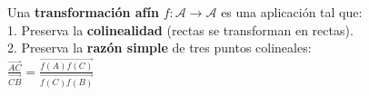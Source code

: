 \documentclass[preview]{standalone}
\begin{document}
\begin{center}
Una \textbf{transformación afín} $f: \mathcal{A} \to \mathcal{A}$ es una aplicación tal que:\\1. Preserva la \textbf{colinealidad} (rectas se transforman en rectas).\\2. Preserva la \textbf{razón simple} de tres puntos colineales:\\$\frac{\vec{AC}}{\vec{CB}} = \frac{\vec{f(A)f(C)}}{\vec{f(C)f(B)}}$
\end{center}
\end{document}
